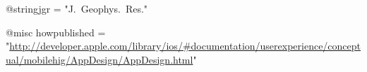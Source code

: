 @string{jgr = "J.~Geophys.~Res."}

@misc{
    howpublished = "\url{http://developer.apple.com/library/ios/#documentation/userexperience/conceptual/mobilehig/AppDesign/AppDesign.html}"
}